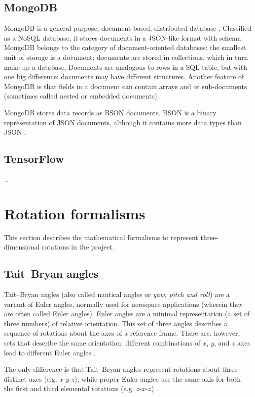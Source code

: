 \subsection{MongoDB}
MongoDB is a general purpose, document-based, distributed database \cite{MongoDB}. Classified as a NoSQL database, it stores documents in a JSON-like format with schema. MongoDB belongs to the category of document-oriented databases: the smallest unit of storage is a document; documents are stored in collections, which in turn make up a database. Documents are analogous to rows in a SQL table, but with one big difference: documents may have different structures. Another feature of MongoDB is that fields in a document can contain arrays and or sub-documents (sometimes called nested or embedded documents).

MongoDB stores data records as BSON documents. BSON is a binary representation of JSON documents, although it contains more data types than JSON \cite{BSONSpec}.

\subsection{TensorFlow}
\dots

\section{Rotation formalisms}
This section describes the mathematical formalisms to represent three-dimensional rotations in the project.

\subsection{Tait–Bryan angles}
Tait–Bryan angles (also called nautical angles or \textit{yaw, pitch and roll}) are a variant of Euler angles, normally used for aerospace applications (wherein they are often called Euler angles). Euler angles are a minimal representation (a set of three numbers) of relative orientation. This set of three angles describes a sequence of rotations about the axes of a reference frame. There are, however, sets that describe the same orientation: different combinations of $x$, $y$, and $z$ axes lead to different Euler angles \cite{Rob20}.

The only difference is that Tait–Bryan angles represent rotations about three distinct axes (e.g. $x$-$y$-$z$), while proper Euler angles use the same axis for both the first and third elemental rotations (e.g. $z$-$x$-$z$) \cite{WikipediaEulerAngles}.

